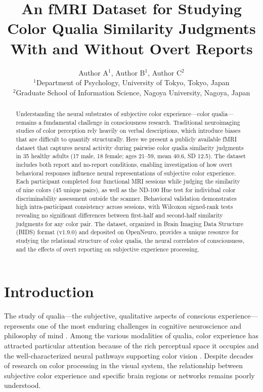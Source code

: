 \documentclass[11pt]{article}
\title{An fMRI Dataset for Studying Color Qualia Similarity Judgments With and Without Overt Reports}
\author{Author A$^{1}$, Author B$^{1}$, Author C$^{2}$ \\
\small $^{1}$Department of Psychology, University of Tokyo, Tokyo, Japan \\
\small $^{2}$Graduate School of Information Science, Nagoya University, Nagoya, Japan}
\date{}
\begin{document}
\maketitle

\begin{abstract}
Understanding the neural substrates of subjective color experience---color qualia---remains a fundamental challenge in consciousness research. Traditional neuroimaging studies of color perception rely heavily on verbal descriptions, which introduce biases that are difficult to quantify structurally. Here we present a publicly available fMRI dataset that captures neural activity during pairwise color qualia similarity judgments in 35 healthy adults (17 male, 18 female; ages 21--59, mean 40.6, SD 12.5). The dataset includes both report and no-report conditions, enabling investigation of how overt behavioral responses influence neural representations of subjective color experience. Each participant completed four functional MRI sessions while judging the similarity of nine colors (45 unique pairs), as well as the ND-100 Hue test for individual color discriminability assessment outside the scanner. Behavioral validation demonstrates high intra-participant consistency across sessions, with Wilcoxon signed-rank tests revealing no significant differences between first-half and second-half similarity judgments for any color pair. The dataset, organized in Brain Imaging Data Structure (BIDS) format (v1.9.0) and deposited on OpenNeuro, provides a unique resource for studying the relational structure of color qualia, the neural correlates of consciousness, and the effects of overt reporting on subjective experience processing.
\end{abstract}

\section{Introduction}

The study of qualia---the subjective, qualitative aspects of conscious experience---represents one of the most enduring challenges in cognitive neuroscience and philosophy of mind \citep{chalmers1996conscious, nagel1974like}. Among the various modalities of qualia, color experience has attracted particular attention because of the rich perceptual space it occupies and the well-characterized neural pathways supporting color vision \citep{zeki1980representation, conway2009color}. Despite decades of research on color processing in the visual system, the relationship between subjective color experience and specific brain regions or networks remains poorly understood.
\end{document}
